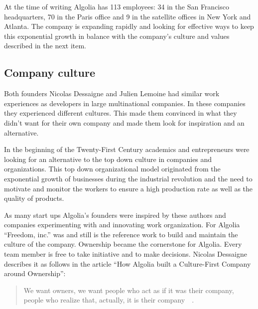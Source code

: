 At the time of writing Algolia has 113 employees: 34 in the San Francisco headquarters, 70 in the Paris office and 9 in the satellite offices in New York and Atlanta. The company is expanding rapidly and looking for effective ways to keep this exponential growth in balance with the company’s culture and values described in the next item.

\subsection{Company culture}
\label{sub:company_culture}

Both founders Nicolas Dessaigne and Julien Lemoine had similar work experiences as developers in large multinational companies. In these companies they experienced different cultures. This made them convinced in what they didn't want for their own company and made them look for inspiration and an alternative.

In the beginning of the Twenty-First Century academics and entrepreneurs were looking for an alternative to the top down culture in companies and organizations. This top down organizational model originated from the exponential growth of businesses during the industrial revolution and the need to motivate and monitor the workers to ensure a high production rate as well as the quality of products.


As many start ups Algolia’s founders were inspired by these authors and companies experimenting with and innovating work organization. For Algolia ``Freedom, inc.''\cite{freedom-inc} was and still is the reference work to build and maintain the culture of the company. Ownership became the cornerstone for Algolia. Every team member is free to take initiative and to make decisions. Nicolas Dessaigne describes it as follows in the article ``How Algolia built a Culture-First Company around Ownership'':

\begin{quote}
We want owners, we want people who act as if it was their company, people who realize that, actually, it is their company~\cite{culture-first}~.
\end{quote}

